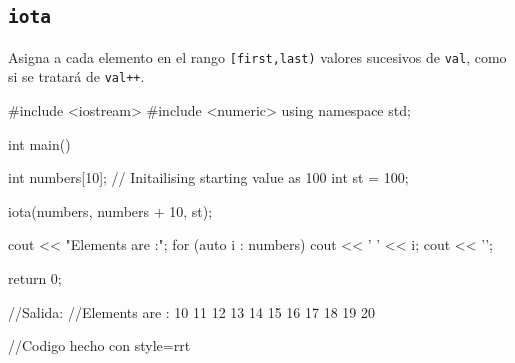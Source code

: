 \documentclass[a4paper,11pt]{article}
\begin{document}
\subsection*{\texttt{iota}}
Asigna a cada elemento en el rango \texttt{[first,last)} valores sucesivos de \texttt{val}, como si se tratará de \texttt{val++}.
\begin{pyglist}[language=c++,caption={iota},listingname={\textbf{Ejemplo}},style=rrt]
#include <iostream> 
#include <numeric>
using namespace std;  
  
int main() { 
    int numbers[10]; 
    // Initailising starting value as 100 
    int st = 100; 
  
    iota(numbers, numbers + 10, st); 
  
    cout << "Elements are :"; 
    for (auto i : numbers) 
        cout << ' ' << i; 
    cout << '\n'; 
  
    return 0; 
} 
//Salida:
//Elements are : 10 11 12 13 14 15 16 17 18 19 20

//Codigo hecho con style=rrt
\end{pyglist}
\newpage
\end{document}
